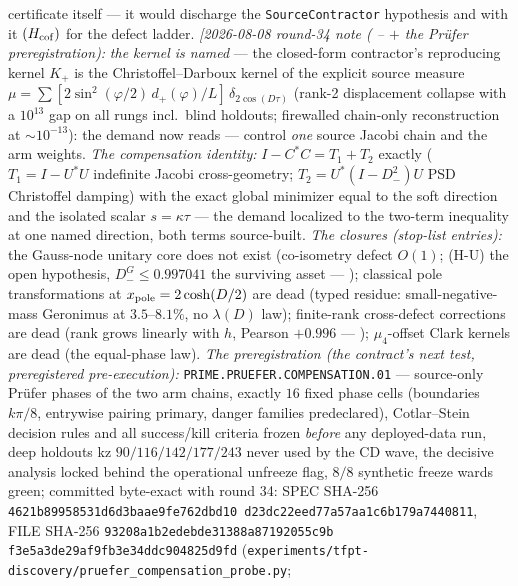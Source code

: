 {certificate itself --- it would discharge the
\texttt{SourceContractor} hypothesis and with it
$(H_{\rm cof})$ for the defect ladder.
\emph{[2026-08-08 round-34 note
( --
 $+$ the Pr\"ufer
preregistration):} \emph{the kernel is named} --- the closed-form
contractor's reproducing kernel $K_+$ is the
Christoffel--Darboux kernel of the explicit source measure $\mu
= \sum [2\sin^2(\varphi/2)\,d_+(\varphi)/L]\,
\delta_{2\cos(D\tau)}$ (rank-2 displacement collapse with a
$10^{13}$ gap on all rungs incl.\ blind holdouts; firewalled
chain-only reconstruction at ${\sim}10^{-13}$): the demand now
reads --- control \emph{one} source Jacobi chain and the arm
weights.  \emph{The compensation identity:} $I - C^*C = T_1 +
T_2$ exactly ($T_1 = I - U^*U$ indefinite Jacobi cross-geometry;
$T_2 = U^*(I - D_-^2)U$ PSD Christoffel damping) with the exact
global minimizer equal to the soft direction and the isolated
scalar $s = \kappa\tau$ --- the demand localized to the two-term
inequality at one named direction, both terms source-built.
\emph{The closures (stop-list entries):} the Gauss-node unitary
core does not exist (co-isometry defect $O(1)$; (H-U) the open
hypothesis, $D_-^G \le 0.997041$ the surviving asset ---
); classical
pole transformations at $x_{\rm pole} = 2\cosh(D/2)$ are dead
(typed residue: small-negative-mass Geronimus at $3.5$--$8.1\%$,
no $\lambda(D)$ law); finite-rank cross-defect corrections are
dead (rank grows linearly with $h$, Pearson $+0.996$ ---
);
$\mu_4$-offset Clark kernels are dead (the equal-phase law).
\emph{The preregistration (the contract's next test,
preregistered pre-execution):}
\texttt{PRIME.PRUEFER.COMPENSATION.01} --- source-only Pr\"ufer
phases of the two arm chains, exactly $16$ fixed phase cells
(boundaries $k\pi/8$, entrywise pairing primary, danger families
predeclared), Cotlar--Stein decision rules and all success/kill
criteria frozen \emph{before} any deployed-data run, deep
holdouts kz $90/116/142/177/243$ never used by the CD wave, the
decisive analysis locked behind the operational unfreeze flag,
$8/8$ synthetic freeze wards green; committed byte-exact with
round 34: SPEC SHA-256
\texttt{4621b89958531d6d\allowbreak 3baae9fe762dbd10\allowbreak
d23dc22eed77a57a\allowbreak a1c6b179a7440811},
FILE SHA-256
\texttt{93208a1b2edebde3\allowbreak 1388a87192055c9b\allowbreak
f3e5a3de29af9fb3\allowbreak e34ddc904825d9fd}
(\texttt{experiments/\allowbreak tfpt-discovery/\allowbreak pruefer\_compensation\_probe.py};
}
